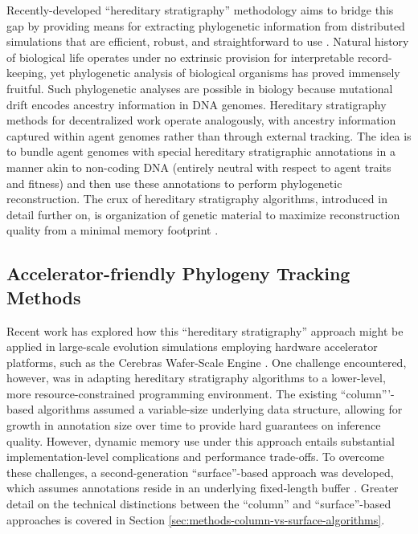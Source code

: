 Recently-developed ``hereditary stratigraphy'' methodology aims to bridge this gap by providing means for extracting phylogenetic information from distributed simulations that are efficient, robust, and straightforward to use \citep{moreno2022hereditary}.
Natural history of biological life operates under no extrinsic provision for interpretable record-keeping, yet phylogenetic analysis of biological organisms has proved immensely fruitful.
Such phylogenetic analyses are possible in biology because mutational drift encodes ancestry information in DNA genomes.
Hereditary stratigraphy methods for decentralized work operate analogously, with ancestry information captured within agent genomes rather than through external tracking.
The idea is to bundle agent genomes with special hereditary stratigraphic annotations in a manner akin to non-coding DNA (entirely neutral with respect to agent traits and fitness) and then use these annotations to perform phylogenetic reconstruction.
The crux of hereditary stratigraphy algorithms, introduced in detail further on, is organization of genetic material to maximize reconstruction quality from a minimal memory footprint \citep{moreno2022hereditary}.

\subsection{Accelerator-friendly Phylogeny Tracking Methods}

Recent work has explored how this ``hereditary stratigraphy'' approach might be applied in large-scale evolution simulations employing hardware accelerator platforms, such as the Cerebras Wafer-Scale Engine \citep{moreno2024trackable}.
One challenge encountered, however, was in adapting hereditary stratigraphy algorithms to a lower-level, more resource-constrained programming environment.
The existing ``column'''-based algorithms assumed a variable-size underlying data structure, allowing for growth in annotation size over time to provide hard guarantees on inference quality.
However, dynamic memory use under this approach entails substantial implementation-level complications and performance trade-offs.
To overcome these challenges, a second-generation ``surface''-based approach was developed, which assumes annotations reside in an underlying fixed-length buffer \citep{moreno2024algorithms}.
Greater detail on the technical distinctions between the ``column'' and ``surface''-based approaches is covered in Section \ref{sec:methods-column-vs-surface-algorithms}.

